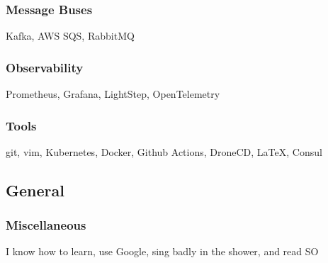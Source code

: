 \documentclass[]{two-column-resume}
\begin{document}
\begin{minipage}[t]{0.34\textwidth}
    \subsubsection{Message Buses}
            Kafka, 
            AWS SQS, 
            RabbitMQ
        \newline
    \subsubsection{Observability}
            Prometheus, 
            Grafana, 
            LightStep, 
            OpenTelemetry
        \newline
    \subsubsection{Tools}
            git, 
            vim, 
            Kubernetes, 
            Docker, 
            Github Actions, 
            DroneCD, 
            \LaTeX, 
            Consul
        \newline

\sectionsep

\subsection{General}








\subsubsection{Miscellaneous}
I know how to learn, use Google, sing badly in the shower, and read SO

\setlength{\parindent}{0ex}
    \sectionsep

%
%

%
%


\end{minipage}
\end{document}
